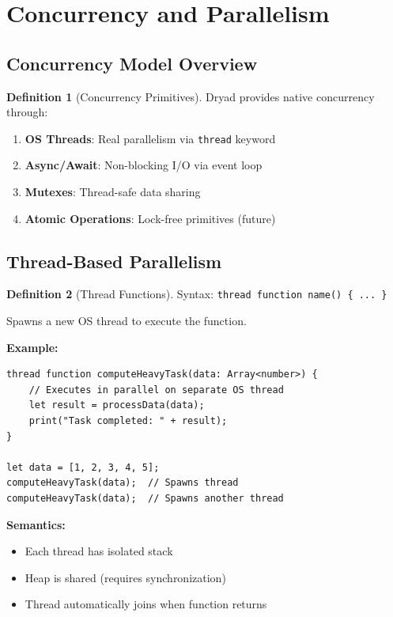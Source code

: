 \documentclass[12pt,a4paper]{article}
\theoremstyle{definition}
\newtheorem{definition}{Definition}[section]
\begin{document}
\newpage

\section{Concurrency and Parallelism}

\subsection{Concurrency Model Overview}

\begin{definition}[Concurrency Primitives]
Dryad provides native concurrency through:
\begin{enumerate}[leftmargin=*]
    \item \textbf{OS Threads}: Real parallelism via \texttt{thread} keyword
    \item \textbf{Async/Await}: Non-blocking I/O via event loop
    \item \textbf{Mutexes}: Thread-safe data sharing
    \item \textbf{Atomic Operations}: Lock-free primitives (future)
\end{enumerate}
\end{definition}

\subsection{Thread-Based Parallelism}

\begin{definition}[Thread Functions]
Syntax: \texttt{thread function name() \{ ... \}}

Spawns a new OS thread to execute the function.

\textbf{Example:}
\begin{lstlisting}[language=Dryad]
thread function computeHeavyTask(data: Array<number>) {
    // Executes in parallel on separate OS thread
    let result = processData(data);
    print("Task completed: " + result);
}

let data = [1, 2, 3, 4, 5];
computeHeavyTask(data);  // Spawns thread
computeHeavyTask(data);  // Spawns another thread
\end{lstlisting}

\textbf{Semantics:}
\begin{itemize}[leftmargin=*]
    \item Each thread has isolated stack
    \item Heap is shared (requires synchronization)
    \item Thread automatically joins when function returns
\end{itemize}
\end{definition}
\end{document}
